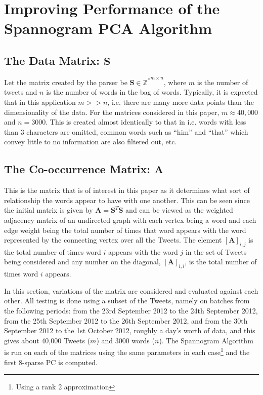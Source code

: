 \documentclass[graybox]{svmult}
\newcommand{\smat}{\mathbf{S}}
\newcommand{\covmat}{\mathbf{A}}
\newcommand{\tp}{^T}
\begin{document}
\section{Improving Performance of the Spannogram PCA Algorithm}
\label{improvement}
\subsection{The Data Matrix: $\smat$}
Let the matrix created by the parser be $\mathbf{S} \in \mathbb{Z^*}^{m \times n}$, where $m$ is the number of tweets and $n$ is the number of words in the bag of words. Typically, it is expected that in this application $m >> n$, i.e. there are many more data points than the dimensionality of the data. For the matrices considered in this paper, $m \approx 40,000$ and $n = 3000$. This is created almost identically to that in \cite{dimakis} i.e. words with less than 3 characters are omitted, common words such as ``him'' and ``that'' which convey little to no information are also filtered out, etc.

\subsection{The Co-occurrence Matrix: $\mathbf{A}$}
\label{covmat}

This is the matrix that is of interest in this paper as it determines what sort of relationship the words appear to have with one another. This can be seen since the initial matrix is given by $\covmat = \smat\tp\smat$ and can be viewed as the weighted adjacency matrix of an undirected graph with each vertex being a word and each edge weight being the total number of times that word appears with the word represented by the connecting vertex over all the Tweets. The element $[\covmat]_{i, j}$ is the total number of times word $i$ appears with the word $j$ in the set of Tweets being considered and any number on the diagonal, $[\covmat]_{i, i}$, is the total number of times word $i$ appears. 

In this section, variations of the matrix are considered and evaluated against each other. All testing is done using a subset of the Tweets, namely on batches from the following periods: from the 23rd September 2012 to the 24th September 2012, from the 25th September 2012 to the 26th September 2012, and from the 30th September 2012 to the 1st October 2012, roughly a day's worth of data, and this gives about 40,000 Tweets ($m$) and 3000 words ($n$). The Spannogram Algorithm is run on each of the matrices using the same parameters in each case\footnote{Using a rank 2 approximation} and the first 8-sparse PC is computed.
\end{document}
